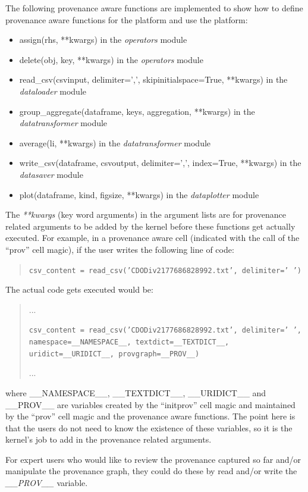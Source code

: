 The following provenance aware functions are implemented to show how to define provenance aware functions for the platform and use the platform:
\begin{itemize}
	\item assign(rhs, **kwargs) in the \emph{operators} module
	\item delete(obj, key, **kwargs) in the \emph{operators} module
	\item read\_csv(csvinput, delimiter=',', skipinitialspace=True, **kwargs) in the \emph{dataloader} module
	\item group\_aggregate(dataframe, keys, aggregation, **kwargs) in the \emph{datatransformer} module
	\item average(li, **kwargs) in the \emph{datatransformer} module
	\item write\_csv(dataframe, csvoutput, delimiter=',', index=True, **kwargs) in the \emph{datasaver} module
	\item plot(dataframe, kind, figsize, **kwargs) in the \emph{dataplotter} module
\end{itemize}
The \emph{**kwargs} (key word arguments) in the argument lists are for provenance related arguments to be added by the kernel before these functions get actually executed. For example, in a provenance aware cell (indicated with the call of the ``prov'' cell magic), if the user writes the following line of code:
\begin{quotation}
\noindent\texttt{csv\_content = read\_csv('CDODiv2177686828992.txt', delimiter=' ')}
\end{quotation}
The actual code gets executed would be:
\begin{quotation}
	\noindent...
	
	\noindent\texttt{csv\_content = read\_csv('CDODiv2177686828992.txt', delimiter=' ', namespace=\_\_NAMESPACE\_\_, textdict=\_\_TEXTDICT\_\_, uridict=\_\_URIDICT\_\_, provgraph=\_\_PROV\_\_)}
	
	\noindent...
\end{quotation}
where \_\_NAMESPACE\_\_, \_\_TEXTDICT\_\_, \_\_URIDICT\_\_ and \_\_PROV\_\_ are variables created by the ``initprov'' cell magic and maintained by the ``prov'' cell magic and the provenance aware functions. The point here is that the users do not need to know the existence of these variables, so it is the kernel's job to add in the provenance related arguments.

For expert users who would like to review the provenance captured so far and/or manipulate the provenance graph, they could do these by read and/or write the \emph{\_\_PROV\_\_} variable.

